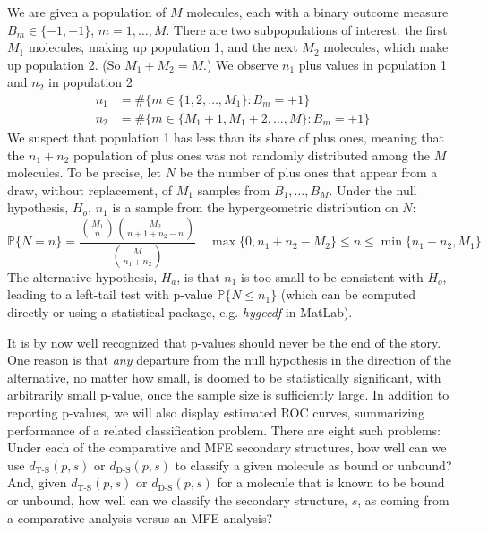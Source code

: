 \documentclass[10pt,letterpaper]{article}
\begin{document}
We are given a population of $M$ molecules, each with a binary outcome measure $B_m\in\{-1,+1\}$, $m=1,\ldots,M$. There are two subpopulations of interest: the first $M_1$ molecules, making up population 1, and the next $M_2$ molecules, which make up population 2. (So $M_1+M_2=M$.) We observe $n_1$ plus values in population 1 and $n_2$ in population 2 
\begin{align}
n_1 & = \#\big\{m\in\{1,2,\ldots,M_1\}:B_m=+1\big\} \\
n_2 & = \#\big\{m\in\{M_1+1,M_1+2,\ldots,M\}:B_m=+1\big\}
\end{align}
We suspect that population 1 has less than its share of plus ones, meaning that the $n_1+n_2$ population of plus ones was not randomly distributed among the $M$ molecules. To be precise, let $N$ be the number of plus ones that appear from a draw, without replacement, of $M_1$ samples from $B_1,\ldots,B_M$. Under the null hypothesis, $H_o$, $n_1$ is a sample from the hypergeometric distribution on $N$:
\begin{equation}
\label{eqn:null}
\mathbb{P}\{N=n\} = \frac{\binom{M_1}{n}\binom{M_2}{n+1+n_2-n}}
{\binom{M}{n_1+n_2}}\quad \max\{0,n_1+n_2-M_2\}\leq n 
\leq \min\{n_1+n_2,M_1\}
\end{equation}
The alternative hypothesis, $H_a$, is that $n_1$ is too small to be consistent with $H_o$, leading to a left-tail test with p-value $\mathbb{P}\{N\leq n_1\}$ (which can be computed directly or using a statistical package, e.g. {\em hygecdf} in MatLab).

It is by now well recognized that p-values should never be the end of the story. One reason is that {\em any} departure from the null hypothesis in the direction of the alternative, no matter how small, is doomed to be statistically significant, with arbitrarily small p-value, once the sample size is sufficiently large. In addition to reporting p-values, we will also display estimated ROC curves, summarizing performance of a related classification problem.  There are eight such problems: Under each of the comparative and MFE secondary structures, how well can we use $d_\text{T-S}(p,s)$ or $d_\text{D-S}(p,s)$ to classify a given molecule as bound or unbound? And, given 
$d_\text{T-S}(p,s)$ or $d_\text{D-S}(p,s)$ for a molecule that is known to be bound or unbound, how well can we classify the secondary structure, $s$, as coming from a comparative analysis versus an MFE analysis?
\end{document}
